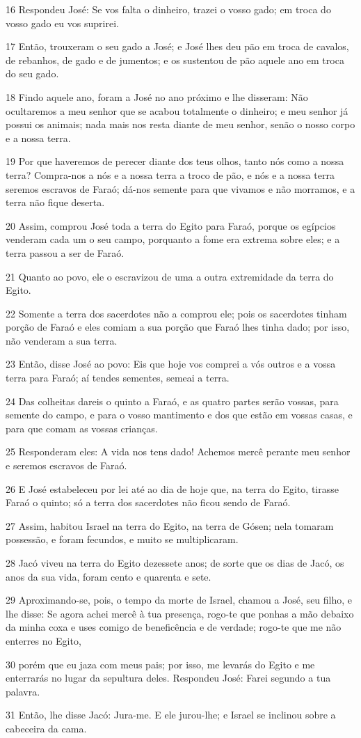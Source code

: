 \par 16 Respondeu José: Se vos falta o dinheiro, trazei o vosso gado; em troca do vosso gado eu vos suprirei.
\par 17 Então, trouxeram o seu gado a José; e José lhes deu pão em troca de cavalos, de rebanhos, de gado e de jumentos; e os sustentou de pão aquele ano em troca do seu gado.
\par 18 Findo aquele ano, foram a José no ano próximo e lhe disseram: Não ocultaremos a meu senhor que se acabou totalmente o dinheiro; e meu senhor já possui os animais; nada mais nos resta diante de meu senhor, senão o nosso corpo e a nossa terra.
\par 19 Por que haveremos de perecer diante dos teus olhos, tanto nós como a nossa terra? Compra-nos a nós e a nossa terra a troco de pão, e nós e a nossa terra seremos escravos de Faraó; dá-nos semente para que vivamos e não morramos, e a terra não fique deserta.
\par 20 Assim, comprou José toda a terra do Egito para Faraó, porque os egípcios venderam cada um o seu campo, porquanto a fome era extrema sobre eles; e a terra passou a ser de Faraó.
\par 21 Quanto ao povo, ele o escravizou de uma a outra extremidade da terra do Egito.
\par 22 Somente a terra dos sacerdotes não a comprou ele; pois os sacerdotes tinham porção de Faraó e eles comiam a sua porção que Faraó lhes tinha dado; por isso, não venderam a sua terra.
\par 23 Então, disse José ao povo: Eis que hoje vos comprei a vós outros e a vossa terra para Faraó; aí tendes sementes, semeai a terra.
\par 24 Das colheitas dareis o quinto a Faraó, e as quatro partes serão vossas, para semente do campo, e para o vosso mantimento e dos que estão em vossas casas, e para que comam as vossas crianças.
\par 25 Responderam eles: A vida nos tens dado! Achemos mercê perante meu senhor e seremos escravos de Faraó.
\par 26 E José estabeleceu por lei até ao dia de hoje que, na terra do Egito, tirasse Faraó o quinto; só a terra dos sacerdotes não ficou sendo de Faraó.
\par 27 Assim, habitou Israel na terra do Egito, na terra de Gósen; nela tomaram possessão, e foram fecundos, e muito se multiplicaram.
\par 28 Jacó viveu na terra do Egito dezessete anos; de sorte que os dias de Jacó, os anos da sua vida, foram cento e quarenta e sete.
\par 29 Aproximando-se, pois, o tempo da morte de Israel, chamou a José, seu filho, e lhe disse: Se agora achei mercê à tua presença, rogo-te que ponhas a mão debaixo da minha coxa e uses comigo de beneficência e de verdade; rogo-te que me não enterres no Egito,
\par 30 porém que eu jaza com meus pais; por isso, me levarás do Egito e me enterrarás no lugar da sepultura deles. Respondeu José: Farei segundo a tua palavra.
\par 31 Então, lhe disse Jacó: Jura-me. E ele jurou-lhe; e Israel se inclinou sobre a cabeceira da cama.


